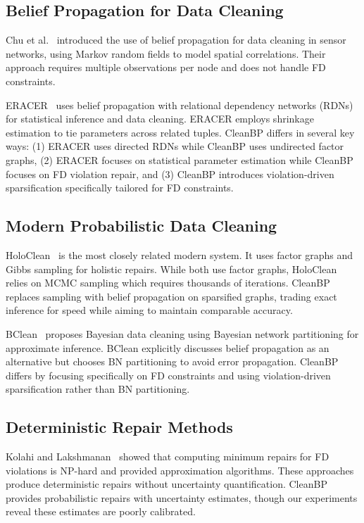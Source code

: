 \documentclass{article}
\begin{document}
\subsection{Belief Propagation for Data Cleaning}

Chu et al.~\citep{chu2005data} introduced the use of belief propagation for data cleaning in sensor networks, using Markov random fields to model spatial correlations. Their approach requires multiple observations per node and does not handle FD constraints.

ERACER~\citep{mayfield2010eracer} uses belief propagation with relational dependency networks (RDNs) for statistical inference and data cleaning. ERACER employs shrinkage estimation to tie parameters across related tuples. CleanBP differs in several key ways: (1) ERACER uses directed RDNs while CleanBP uses undirected factor graphs, (2) ERACER focuses on statistical parameter estimation while CleanBP focuses on FD violation repair, and (3) CleanBP introduces violation-driven sparsification specifically tailored for FD constraints.

\subsection{Modern Probabilistic Data Cleaning}

HoloClean~\citep{rekatsinas2017holoclean} is the most closely related modern system. It uses factor graphs and Gibbs sampling for holistic repairs. While both use factor graphs, HoloClean relies on MCMC sampling which requires thousands of iterations. CleanBP replaces sampling with belief propagation on sparsified graphs, trading exact inference for speed while aiming to maintain comparable accuracy.

BClean~\citep{qin2024bclean} proposes Bayesian data cleaning using Bayesian network partitioning for approximate inference. BClean explicitly discusses belief propagation as an alternative but chooses BN partitioning to avoid error propagation. CleanBP differs by focusing specifically on FD constraints and using violation-driven sparsification rather than BN partitioning.

\subsection{Deterministic Repair Methods}

Kolahi and Lakshmanan~\citep{kolahi2009approximating} showed that computing minimum repairs for FD violations is NP-hard and provided approximation algorithms. These approaches produce deterministic repairs without uncertainty quantification. CleanBP provides probabilistic repairs with uncertainty estimates, though our experiments reveal these estimates are poorly calibrated.
\end{document}

